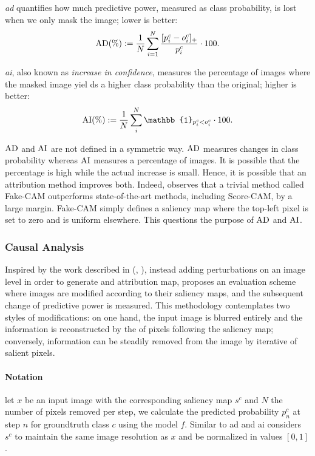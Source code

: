\emph{\gls{ad}}  quantifies how much predictive power, measured as class probability, 
is lost when we only mask the image; lower is better:
\begin{equation}
	\operatorname{AD}(\%) \mathrel{:=} \frac{1}{N} \sum_{i=1}^N \frac{[p^c_i - o^c_i]_+}{p^c_i} \cdot 100.
\label{eq:ad}
\end{equation}

\emph{\gls{ai}}, also known as \emph{increase in confidence}, measures the 
percentage of images where the masked image yiel ds a higher class probability than the original; 
higher is better:
\begin{equation}
	\AI(\%) \defn \frac{1}{N} \sum_i^N \mathbb{1}_{p^c_i < o^c_i} \cdot 100.
\label{eq:ai}
\end{equation}

$\operatorname{AD}$ and $\operatorname{AI}$ are not defined in a symmetric way. $\operatorname{AD}$ measures changes in class probability 
whereas $\operatorname{AI}$ measures a percentage of images. It is possible that the percentage is high while 
the actual increase is small. Hence, it is possible that an attribution method improves both. 
Indeed, \autocite{poppi2021revisiting} observes that a trivial method called Fake-CAM outperforms 
state-of-the-art methods, including Score-CAM, by a large margin. Fake-CAM simply defines a 
saliency map where the top-left pixel is set to zero and is uniform elsewhere. 
This questions the purpose of $\operatorname{AD}$ and $\operatorname{AI}$.

\subsubsection{Causal Analysis} 
\label{sec:causal_metrics}
Inspired by the work described in (\cite{fong2017interpretable}, 
\cite{fong2019understanding}), instead adding perturbations on an image level in order to generate 
and attribution map, \cite{petsiuk2018rise} proposes an evaluation scheme where images are modified 
according to their saliency maps, and the subsequent change of predictive power is measured. This 
methodology contemplates two styles of modifications: on one hand, the input image is blurred 
entirely and the information is reconstructed by the  of pixels following the 
saliency map; conversely, information can be steadily removed from the image by iterative
 of salient pixels.

\paragraph{Notation} let $x$ be an input image with the corresponding saliency map $s^c$ and $N$ the 
number of pixels removed per step, we calculate the predicted probability $p^c_n$ at step $n$ for 
groundtruth class $c$ using the model $f$.  Similar to \gls{ad} and \gls{ai} \cite{petsiuk2018rise} 
considers $s^c$ to maintain the same image resolution as $x$ and be normalized in values $[0,1]$.\\

